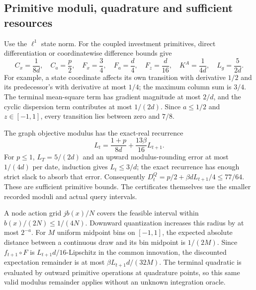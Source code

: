 \subsection{Primitive moduli, quadrature and sufficient resources}
Use the $\ell^1$ state norm. For the coupled investment primitives, direct differentiation or coordinatewise difference bounds give
\[
 C_x=\frac1{8d},\quad C_a=\frac p2,\quad F_x=\frac34,
 \quad F_a=\frac d4,\quad F_z=\frac d{16},\quad K^A=\frac1{4d},\quad L_g=\frac5{2d}.
\]
For example, a state coordinate affects its own transition with derivative $1/2$ and its predecessor's with derivative at most $1/4$; the maximum column sum is $3/4$. The terminal mean-square term has gradient magnitude at most $2/d$, and the cyclic dispersion term contributes at most $1/(2d)$. Since $a\le1/2$ and $z\in[-1,1]$, every transition lies between zero and $7/8$.

The graph objective modulus has the exact-real recurrence
\[
 L_t=\frac{1+p}{8d}+\frac{13\beta}{16}L_{t+1}.
\]
For $p\le1$, $L_T=5/(2d)$ and an upward modulus-rounding error at most $1/(4d)$ per date, induction gives $L_t\le3/d$; the exact recurrence has enough strict slack to absorb that error. Consequently
$D_t^Q=p/2+\beta dL_{t+1}/4\le77/64$.
These are sufficient primitive bounds. The certificates themselves use the smaller recorded moduli and actual query intervals.

A node action grid $j b(x)/N$ covers the feasible interval within $b(x)/(2N)\le1/(4N)$. Downward quantization increases this radius by at most $2^{-a}$. For $M$ uniform midpoint bins on $[-1,1]$, the expected absolute distance between a continuous draw and its bin midpoint is $1/(2M)$. Since $f_{t+1}\circ F$ is $L_{t+1}d/16$-Lipschitz in the common innovation, the discounted expectation remainder is at most $\beta L_{t+1}d/(32M)$. The terminal quadratic is evaluated by outward primitive operations at quadrature points, so this same valid modulus remainder applies without an unknown integration oracle.

